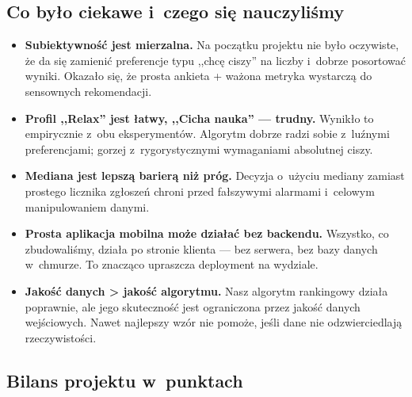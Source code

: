 \documentclass[14pt,a4paper]{extarticle}
\begin{document}
\subsection{Co było ciekawe i~czego się nauczyliśmy}

\begin{itemize}
    \item \textbf{Subiektywność jest mierzalna.} Na początku projektu nie było oczywiste, że da się zamienić preferencje typu ,,chcę ciszy'' na liczby i~dobrze posortować wyniki. Okazało się, że prosta ankieta + ważona metryka wystarczą do sensownych rekomendacji.

    \item \textbf{Profil ,,Relax'' jest łatwy, ,,Cicha nauka'' --- trudny.} Wynikło to empirycznie z~obu eksperymentów. Algorytm dobrze radzi sobie z~luźnymi preferencjami; gorzej z~rygorystycznymi wymaganiami absolutnej ciszy.

    \item \textbf{Mediana jest lepszą barierą niż próg.} Decyzja o~użyciu mediany zamiast prostego licznika zgłoszeń chroni przed fałszywymi alarmami i~celowym manipulowaniem danymi.

    \item \textbf{Prosta aplikacja mobilna może działać bez backendu.} Wszystko, co zbudowaliśmy, działa po stronie klienta --- bez serwera, bez bazy danych w~chmurze. To znacząco upraszcza deployment na wydziale.

    \item \textbf{Jakość danych > jakość algorytmu.} Nasz algorytm rankingowy działa poprawnie, ale jego skuteczność jest ograniczona przez jakość danych wejściowych. Nawet najlepszy wzór nie pomoże, jeśli dane nie odzwierciedlają rzeczywistości.
\end{itemize}

\subsection{Bilans projektu w~punktach}
\end{document}

